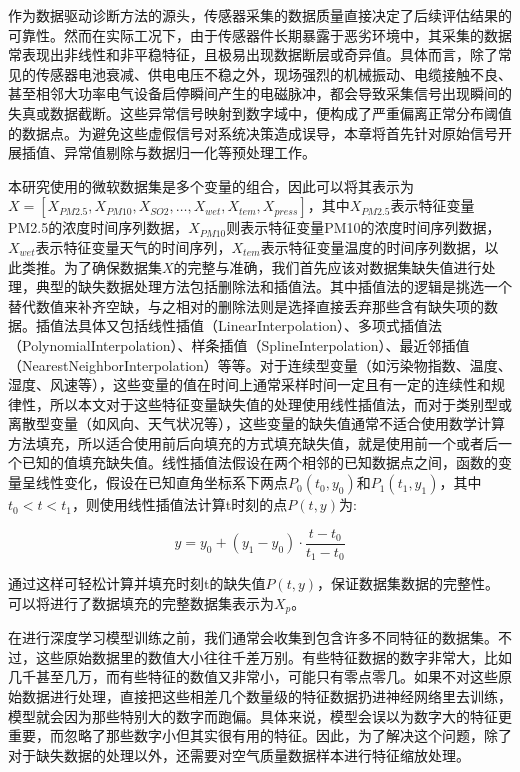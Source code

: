 作为数据驱动诊断方法的源头，传感器采集的数据质量直接决定了后续评估结果的可靠性。然而在实际工况下，由于传感器件长期暴露于恶劣环境中，其采集的数据常表现出非线性和非平稳特征，且极易出现数据断层或奇异值。具体而言，除了常见的传感器电池衰减、供电电压不稳之外，现场强烈的机械振动、电缆接触不良、甚至相邻大功率电气设备启停瞬间产生的电磁脉冲，都会导致采集信号出现瞬间的失真或数据截断。这些异常信号映射到数字域中，便构成了严重偏离正常分布阈值的数据点。为避免这些虚假信号对系统决策造成误导，本章将首先针对原始信号开展插值、异常值剔除与数据归一化等预处理工作。

本研究使用的微软数据集是多个变量的组合，因此可以将其表示为$X=[X_{PM2.5},X_{PM10},X_{SO2},\ldots,X_{wet},X_{tem},X_{press}]$，其中$X_{PM2.5}$表示特征变量PM2.5的浓度时间序列数据，$X_{PM10}$则表示特征变量PM10的浓度时间序列数据，$X_{wet}$表示特征变量天气的时间序列，$X_{tem}$表示特征变量温度的时间序列数据，以此类推。为了确保数据集$X$的完整与准确，我们首先应该对数据集缺失值进行处理，典型的缺失数据处理方法包括删除法和插值法。其中插值法的逻辑是挑选一个替代数值来补齐空缺，与之相对的删除法则是选择直接丢弃那些含有缺失项的数据。插值法具体又包括线性插值（LinearInterpolation）、多项式插值法（PolynomialInterpolation）、样条插值（SplineInterpolation）、最近邻插值（NearestNeighborInterpolation）等等。对于连续型变量（如污染物指数、温度、湿度、风速等），这些变量的值在时间上通常采样时间一定且有一定的连续性和规律性，所以本文对于这些特征变量缺失值的处理使用线性插值法，而对于类别型或离散型变量（如风向、天气状况等），这些变量的缺失值通常不适合使用数学计算方法填充，所以适合使用前后向填充的方式填充缺失值，就是使用前一个或者后一个已知的值填充缺失值。线性插值法假设在两个相邻的已知数据点之间，函数的变量呈线性变化，假设在已知直角坐标系下两点$P_0(t_0,y_0)$和$P_1(t_1,y_1)$，其中$t_0<t<t_1$，则使用线性插值法计算t时刻的点$P(t,y)$为:

\begin{equation}
    y=y_0+(y_1-y_0) \cdot \frac{t-t_0}{t_1-t_0}
\end{equation}

通过这样可轻松计算并填充时刻t的缺失值$P(t,y)$，保证数据集数据的完整性。可以将进行了数据填充的完整数据集表示为$X_p$。

在进行深度学习模型训练之前，我们通常会收集到包含许多不同特征的数据集。不过，这些原始数据里的数值大小往往千差万别。有些特征数据的数字非常大，比如几千甚至几万，而有些特征的数值又非常小，可能只有零点零几。如果不对这些原始数据进行处理，直接把这些相差几个数量级的特征数据扔进神经网络里去训练，模型就会因为那些特别大的数字而跑偏。具体来说，模型会误以为数字大的特征更重要，而忽略了那些数字小但其实很有用的特征。因此，为了解决这个问题，除了对于缺失数据的处理以外，还需要对空气质量数据样本进行特征缩放处理。

